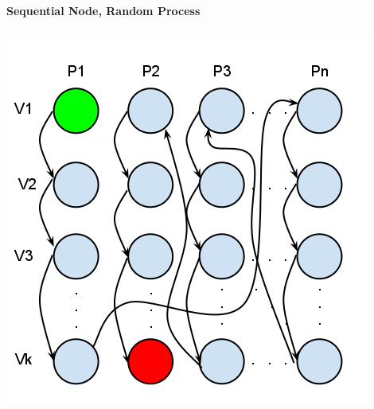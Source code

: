 \documentclass[final]{beamer} %
\begin{document}
\begin{frame}[t]
\begin{columns}[t]
\begin{column}{0.60\paperwidth}
\begin{columns}[t,totalwidth=0.60\paperwidth]
\begin{column}{0.28\paperwidth}
\begin{columns}[t,totalwidth=0.28\paperwidth]
\begin{column}{0.12\paperwidth}
							\end{column}
						\end{columns}
					\end{column}
				\end{columns}
				\begin{columns}[t,totalwidth=0.60\paperwidth]
					\begin{column}{0.28\paperwidth}
						\begin{center} \bf{Sequential Node, Random Process} \end{center}
						\begin{columns}[t,totalwidth=0.28\paperwidth]
							\begin{column}{0.12\paperwidth}
								\begin{center} \includegraphics[width=0.12\paperwidth]{img/linked_list/seq_node_rand_proc} \end{center}
							\end{column}
							\begin{column}{0.12\paperwidth}

\end{column}
\end{columns}
\end{column}
\end{columns}
\end{column}
\end{columns}
\end{frame}
\end{document}
